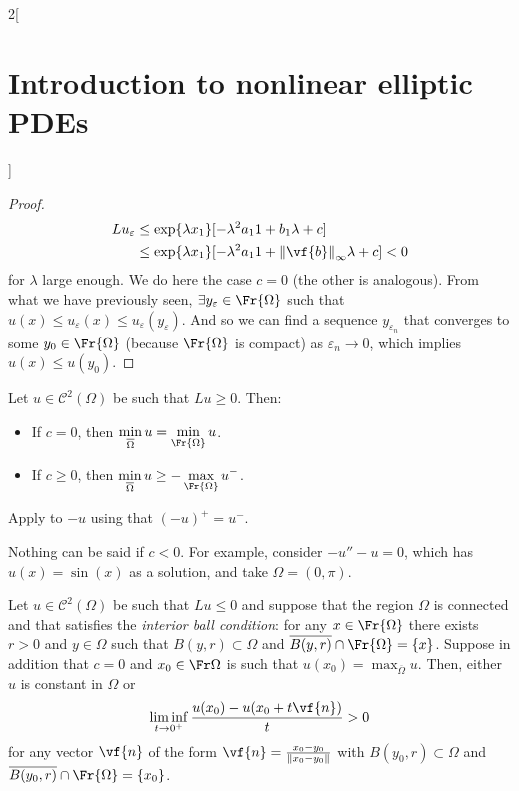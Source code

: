 \documentclass[../../../main_math.tex]{subfiles}
\begin{document}
\begin{multicols}{2}[\section{Introduction to nonlinear elliptic PDEs}]
\begin{proof}
    \begin{align*}
      Lu_\varepsilon & \leq \exp{\lambda x_1}[-\lambda^2a_11+b_1\lambda+c]                    \\
                     & \leq \exp{\lambda x_1}[-\lambda^2a_11+\norm{\vf{b}}_\infty\lambda+c]<0
    \end{align*}
    for $\lambda$ large enough. We do here the case $c=0$ (the other is analogous). From what we have previously seen, $\exists y_\varepsilon\in\Fr{\Omega}$ such that $u(x)\leq u_\varepsilon(x)\leq u_\varepsilon(y_\varepsilon)$. And so we can find a sequence $y_{\varepsilon_n}$ that converges to some $y_0\in\Fr{\Omega}$ (because $\Fr{\Omega}$ is compact) as $\varepsilon_n\to 0$, which implies $u(x)\leq u(y_0)$.
  \end{proof}
  \begin{theorem}
    Let $u\in \mathcal{C}^2(\Omega)$ be such that $Lu\geq 0$. Then:
    \begin{itemize}
      \item If $c=0$, then $\displaystyle \min_{\overline{\Omega}}u=\min_{\Fr{\Omega}}u$.
      \item If $c\geq 0$, then $\displaystyle \min_{\overline{\Omega}} u \geq -\max_{\Fr{\Omega}}u^-$.
    \end{itemize}
  \end{theorem}
  \begin{sproof}
    Apply  to $-u$ using that ${(-u)}^+=u^-$.
  \end{sproof}
  \begin{remark}
    Nothing can be said if $c<0$. For example, consider $-u''-u=0$, which has $u(x)=\sin(x)$ as a solution, and take $\Omega=(0,\pi)$.
  \end{remark}
  \begin{lemma}\label{INEPDE:Hopf}
    Let $u\in \mathcal{C}^2(\Omega)$ be such that $Lu\leq 0$ and suppose that the region $\Omega$ is connected and that satisfies the \emph{interior ball condition}: for any $x\in \Fr{\Omega}$ there exists $r>0$ and $y\in \Omega$ such that $B(y,r)\subset \Omega$ and $\overline{B(y,r)}\cap \Fr{\Omega}=\{x\}$. Suppose in addition that $c=0$ and $x_0\in\Fr\Omega$ is such that $\displaystyle u(x_0)=\max_{\overline{\Omega}}u$. Then, either $u$ is constant in $\Omega$ or
    $$
      \liminf_{t\to 0^+}\frac{u(x_0) - u(x_0+t\vf{n})}{t}>0
    $$
    for any vector $\vf{n}$ of the form $\vf{n}=\frac{x_0-y_0}{\norm{x_0-y_0}}$ with $B(y_0,r)\subset \Omega$ and $\overline{B(y_0,r)}\cap \Fr{\Omega}=\{x_0\}$.

\end{lemma}
\end{multicols}
\end{document}

